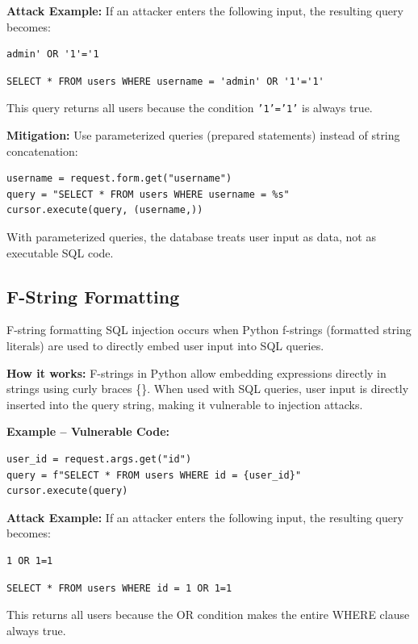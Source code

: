 \textbf{Attack Example:} If an attacker enters the following input, the resulting query becomes:
\begin{lstlisting}[style=attackcode]
admin' OR '1'='1
\end{lstlisting}
\begin{lstlisting}[style=attackcode]
SELECT * FROM users WHERE username = 'admin' OR '1'='1'
\end{lstlisting}
This query returns all users because the condition \texttt{'1'='1'} is always true.

\textbf{Mitigation:} Use parameterized queries (prepared statements) instead of string concatenation:

\begin{lstlisting}[style=pycode]
username = request.form.get("username")
query = "SELECT * FROM users WHERE username = %s"
cursor.execute(query, (username,))
\end{lstlisting}
With parameterized queries, the database treats user input as data, not as executable SQL code.

\subsection{F-String Formatting}
\label{sec:sqli_fstring}

F-string formatting SQL injection occurs when Python f-strings (formatted string literals) are used to directly embed user input into SQL queries.

\textbf{How it works:} F-strings in Python allow embedding expressions directly in strings using curly braces \{\}. When used with SQL queries, user input is directly inserted into the query string, making it vulnerable to injection attacks.

\textbf{Example -- Vulnerable Code:}

\begin{lstlisting}[style=pycode]
user_id = request.args.get("id")
query = f"SELECT * FROM users WHERE id = {user_id}"
cursor.execute(query)
\end{lstlisting}

\textbf{Attack Example:} If an attacker enters the following input, the resulting query becomes:
\begin{lstlisting}[style=attackcode]
1 OR 1=1
\end{lstlisting}
\begin{lstlisting}[style=attackcode]
SELECT * FROM users WHERE id = 1 OR 1=1
\end{lstlisting}
This returns all users because the OR condition makes the entire WHERE clause always true.


